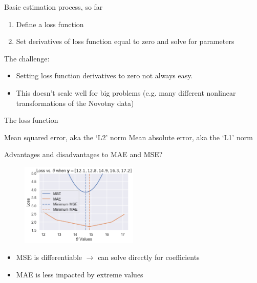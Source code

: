 \documentclass[aspectratio=169]{beamer}
\begin{document}
\begin{frame}{Basic estimation process, so far}
\begin{enumerate}
\item Define a loss function
\item Set derivatives of loss function equal to zero and solve for parameters
\end{enumerate}

\vspace{5mm}
The challenge:
\begin{itemize}
\item Setting loss function derivatives to zero not always easy.
\item This doesn't scale well for big problems (e.g. many different nonlinear transformations of the Novotny data)
\end{itemize}
\end{frame}

\begin{frame}{The loss function}

Mean squared error, aka the `L2' norm
Mean absolute error, aka the `L1' norm

\end{frame}

\begin{frame}{Advantages and disadvantages to MAE and MSE?}
\begin{figure}
	\includegraphics[width=0.5\textwidth]{mae_vs_mse}
	\caption*{}
\end{figure}
\pause
\vspace{-10mm}
\begin{itemize}
	\item MSE is differentiable $\rightarrow$ can solve directly for coefficients
	\item MAE is less impacted by extreme values
\end{itemize}
\end{frame}
\end{document}
